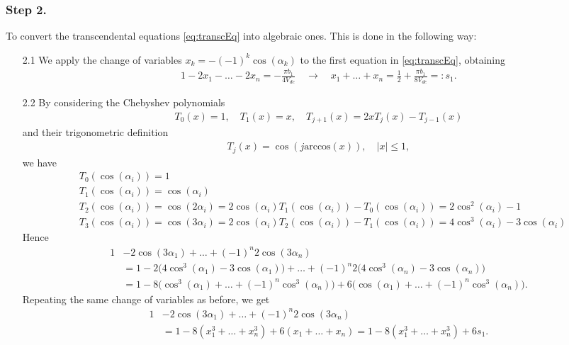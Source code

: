 \documentclass[a4paper]{report}
\begin{document}
\subsubsection*{Step 2.} To convert the transcendental equations \eqref{eq:transcEq} into algebraic ones. This is done in the following way:
\begin{itemize}
	\item[2.1] We apply the change of variables $x_k = -(-1)^k\cos(\alpha_k)$ to the first equation in \eqref{eq:transcEq}, obtaining
	\begin{align*}
		1-2x_1-\ldots -2x_n = -\frac{\pi b_1}{4V_{dc}} \quad\longrightarrow\quad x_1+\ldots +x_n = \frac 12+\frac{\pi b_1}{8V_{dc}}=:s_1.
	\end{align*}
	\item[2.2] By considering the Chebyshev polynomials 
	\begin{align*}
		T_0(x) = 1, \quad T_1(x) = x, \quad T_{j+1}(x) = 2xT_j(x)-T_{j-1}(x)
	\end{align*}
	and their trigonometric definition 
	\begin{align*}
		T_j(x) = \cos(j\mbox{arccos}(x)),\quad |x|\leq 1,
	\end{align*}
	we have
	\begin{align*}
		&T_0(\cos(\alpha_i)) = 1
		\\
		&T_1(\cos(\alpha_i)) = \cos(\alpha_i)
		\\
		&T_2(\cos(\alpha_i)) = \cos(2\alpha_i) = 2\cos(\alpha_i)T_1(\cos(\alpha_i)) -T_0(\cos(\alpha_i)) = 2\cos^2(\alpha_i)-1
		\\
		&T_3(\cos(\alpha_i)) = \cos(3\alpha_i) = 2\cos(\alpha_i)T_2(\cos(\alpha_i)) -T_1(\cos(\alpha_i)) = 4\cos^3(\alpha_i)-3\cos(\alpha_i)
	\end{align*}
	Hence
	\begin{align*}
		1 & -2\cos(3\alpha_1) + \ldots + (-1)^n2\cos(3\alpha_n) 
		\\
		& = 1 -2\Big(4\cos^3(\alpha_1) - 3\cos(\alpha_1)\Big) + \ldots + (-1)^n2\Big(4\cos^3(\alpha_n) - 3\cos(\alpha_n)\Big)
		\\
		& = 1 -8\Big(\cos^3(\alpha_1) + \ldots + (-1)^n\cos^3(\alpha_n)\Big) + 6\Big(\cos(\alpha_1) + \ldots + (-1)^n\cos^3(\alpha_n)\Big).
	\end{align*}
	Repeating the same change of variables as before, we get
	\begin{align*}
		1 & -2\cos(3\alpha_1) + \ldots + (-1)^n2\cos(3\alpha_n) 
		\\
		& = 1 -8(x_1^3 + \ldots + x_n^3) + 6(x_1 + \ldots + x_n) = 1 -8(x_1^3 + \ldots + x_n^3) + 6s_1.

\end{align*}
\end{itemize}
\end{document}
